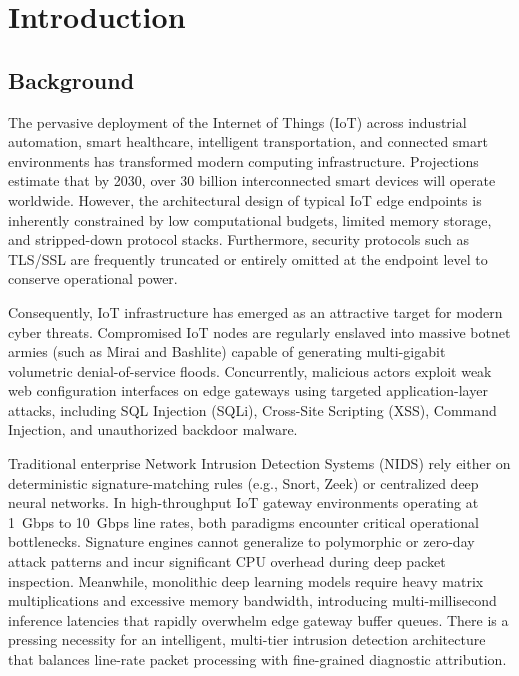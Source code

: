 \documentclass[12pt,a4paper]{report}
\begin{document}


\chapter{Introduction}

\section{Background}
The pervasive deployment of the Internet of Things (IoT) across industrial automation, smart healthcare, intelligent transportation, and connected smart environments has transformed modern computing infrastructure. Projections estimate that by 2030, over 30 billion interconnected smart devices will operate worldwide. However, the architectural design of typical IoT edge endpoints is inherently constrained by low computational budgets, limited memory storage, and stripped-down protocol stacks. Furthermore, security protocols such as TLS/SSL are frequently truncated or entirely omitted at the endpoint level to conserve operational power.

Consequently, IoT infrastructure has emerged as an attractive target for modern cyber threats. Compromised IoT nodes are regularly enslaved into massive botnet armies (such as Mirai and Bashlite) capable of generating multi-gigabit volumetric denial-of-service floods. Concurrently, malicious actors exploit weak web configuration interfaces on edge gateways using targeted application-layer attacks, including SQL Injection (SQLi), Cross-Site Scripting (XSS), Command Injection, and unauthorized backdoor malware.

Traditional enterprise Network Intrusion Detection Systems (NIDS) rely either on deterministic signature-matching rules (e.g., Snort, Zeek) or centralized deep neural networks. In high-throughput IoT gateway environments operating at 1~Gbps to 10~Gbps line rates, both paradigms encounter critical operational bottlenecks. Signature engines cannot generalize to polymorphic or zero-day attack patterns and incur significant CPU overhead during deep packet inspection. Meanwhile, monolithic deep learning models require heavy matrix multiplications and excessive memory bandwidth, introducing multi-millisecond inference latencies that rapidly overwhelm edge gateway buffer queues. There is a pressing necessity for an intelligent, multi-tier intrusion detection architecture that balances line-rate packet processing with fine-grained diagnostic attribution.
\end{document}
